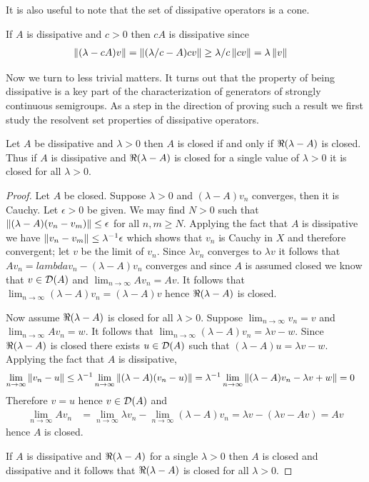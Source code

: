 It is also useful to note that the set of dissipative operators is a cone.
\begin{examp}\label{DissipativeOperatorsCone}
If $A$ is dissipative and $c > 0$ then $c A$ is dissipative since 
\begin{align*}
\left \lVert (\lambda - c A) v \right \rVert &= \left \lVert (\lambda/c - A) c v \right \rVert \geq \lambda/c \left \lVert cv \right \rVert = \lambda \left \lVert v \right \rVert
\end{align*}
\end{examp}

Now we turn to less trivial matters.  It turns out that the property of being dissipative is a key part of the characterization of generators of strongly continuous semigroups.  As a step in the direction of proving such a result we first study the resolvent set properties of dissipative operators.

\begin{prop}\label{DissipativeAndClosed}Let $A$ be dissipative and $\lambda > 0$ then $A$ is closed if and only if $\Re(\lambda - A)$ is closed.  Thus if $A$ is dissipative and $\Re(\lambda - A)$ is closed for a single value of $\lambda > 0$ it is closed for all $\lambda > 0$.
\end{prop}
\begin{proof}
Let $A$ be closed.  Suppose $\lambda>0$ and $(\lambda -A) v_n$ converges, then it is Cauchy.  Let $\epsilon > 0$ be given.  We may find $N > 0$ such that $\left \lVert (\lambda -A)(v_n-v_m) \right \rVert \leq \epsilon$ for all $n,m \geq N$.  Applying the fact that $A$ is dissipative we have $\left \lVert v_n - v_m \right \rVert \leq \lambda^{-1} \epsilon$ which shows that $v_n$ is Cauchy in $X$ and therefore convergent; let $v$ be the limit of $v_n$.  Since $\lambda v_n$ converges to $\lambda v$ it follows that $A v_n = lambda v_n - (\lambda -A) v_n$ converges and since $A$
is assumed closed we know that $v \in \mathcal{D}(A)$ and $\lim_{n \to \infty} A v_n = A v$.  It follows that $\lim_{n \to \infty} (\lambda -A)v_n  = (\lambda -A)v$ hence $\Re(\lambda - A)$ is closed.

Now assume $\Re(\lambda - A)$ is closed for all $\lambda > 0$.  Suppose $\lim_{n \to \infty} v_n = v$ and $\lim_{n \to \infty} A v_n = w$.  It follows that $\lim_{n \to \infty} (\lambda - A) v_n = \lambda v - w$.  Since $\Re(\lambda - A)$ is closed there exists $u \in \mathcal{D}(A)$ such that $(\lambda - A) u = \lambda v - w$.  Applying the fact that $A$ is dissipative,
\begin{align*}
\lim_{n \to \infty} \left \lVert v_n - u \right \rVert &\leq \lambda^{-1}\lim_{n \to \infty} \left \lVert (\lambda - A)(v_n - u) \right \rVert = \lambda^{-1}\lim_{n \to \infty} \left \lVert (\lambda - A)v_n - \lambda v + w \right \rVert = 0
\end{align*}
Therefore $v = u$ hence $v \in \mathcal{D}(A)$ and 
\begin{align*}
\lim_{n \to \infty} A v_n &= \lim_{n \to \infty} \lambda v_n - \lim_{n \to \infty} (\lambda -A) v_n = \lambda v - (\lambda v - A v) = Av
\end{align*}
hence $A$ is closed.

If $A$ is dissipative and $\Re(\lambda - A)$ for a single $\lambda>0$ then $A$ is closed and dissipative and it follows that $\Re(\lambda - A)$ is closed for all $\lambda > 0$.
\end{proof}


